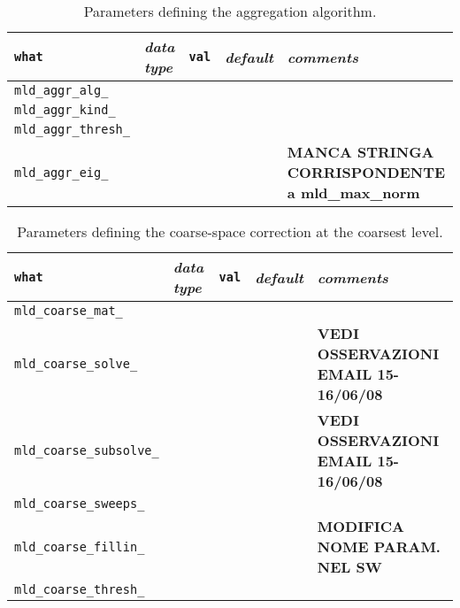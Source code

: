 \begin{sidewaystable}
\begin{center}
\begin{tabular}{|l|l|p{2cm}|l|p{7cm}|}
\hline
\verb|what|              & \emph{data type}        &  \verb|val|      &  \emph{default}  &
\emph{comments} \\ \hline
\verb|mld_aggr_alg_|     &
                         &
                         &
                         &    \\
\verb|mld_aggr_kind_|    &
                         &
                         &
                         &     \\
\verb|mld_aggr_thresh_|  &
                         &
                         &
                         &     \\
\verb|mld_aggr_eig_|     &
                         &
                         &
                         & \textbf{MANCA STRINGA CORRISPONDENTE a mld\_max\_norm} \\
\hline
\end{tabular}
\end{center}
\caption{Parameters defining the aggregation algorithm.
\label{tab:p_aggregation}} 
\end{sidewaystable}
                     
\begin{sidewaystable}
\begin{center}
\begin{tabular}{|l|l|p{2cm}|l|p{7cm}|}
\hline
\verb|what|              & \emph{data type}        &  \verb|val|      &  \emph{default}  &
\emph{comments} \\ \hline
\verb|mld_coarse_mat_|   &
                         &
                         &
                         &     \\
\verb|mld_coarse_solve_| &
                         &
                         &
                         & \textbf{VEDI OSSERVAZIONI EMAIL 15-16/06/08}\\
\verb|mld_coarse_subsolve_| &
                         &
                         &
                         & \textbf{VEDI OSSERVAZIONI EMAIL 15-16/06/08}\\
\verb|mld_coarse_sweeps_|&                         
                         &
                         &
                         &     \\
\verb|mld_coarse_fillin_| &
                         &
                         &
                         &     \textbf{MODIFICA NOME PARAM. NEL SW} \\
\verb|mld_coarse_thresh_| &
                         &
                         &
                         &    \\ \hline
\end{tabular}
\end{center}
\caption{Parameters defining the coarse-space correction at the coarsest
level.\label{tab:p_coarse}} 
\end{sidewaystable}


